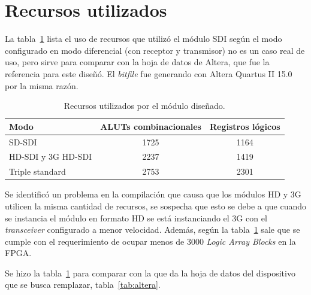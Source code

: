 \section{Recursos utilizados}

  La tabla~\ref{tab:propio} lista el uso de recursos que utilizó el módulo SDI según el modo
  configurado en modo diferencial (con receptor y transmisor) no es un caso real
  de uso, pero sirve para comparar con la hoja de datos de Altera, que fue la
  referencia para este diseñó. El \textit{bitfile} fue generando con Altera
  Quartus II 15.0 por la misma razón.

    \begin{table}[h]
      \centering
      \caption{Recursos utilizados por el módulo diseñado.}\label{tab:propio}
      \begin{tabular}{lcc}
        \toprule
        Modo & ALUTs combinacionales & Registros lógicos \\
        \hline
        SD-SDI & 1725 & 1164 \\
        \hline
        HD-SDI y 3G HD-SDI & 2237 & 1419 \\
        \hline
        Triple standard & 2753 & 2301 \\
        \bottomrule
        \hline
      \end{tabular}
    \end{table}

  Se identificó un problema en la compilación que causa que los módulos HD y 3G utilicen
  la misma cantidad de recursos, se sospecha que esto se debe a que cuando se instancia el
  módulo en formato HD se está instanciando el 3G con el \textit{transceiver}
  configurado a menor velocidad. Además, según la tabla~\ref{tab:propio} sale que se cumple con el
  requerimiento de ocupar menos de 3000 \textit{Logic Array Blocks} en la FPGA\@.

  Se hizo la tabla~\ref{tab:propio} para comparar con la que da la hoja de datos del
  dispositivo que se busca remplazar, tabla~\ref{tab:altera}.

